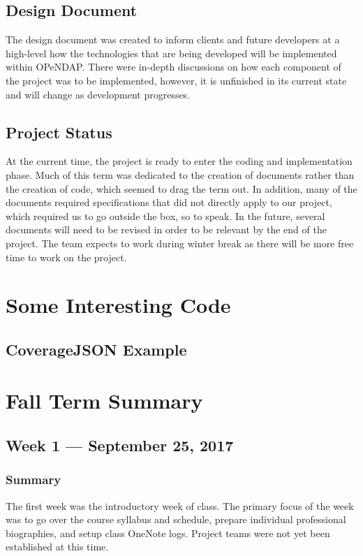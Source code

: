 \documentclass[onecolumn, draftclsnofoot,10pt, compsoc]{IEEEtran}
\begin{document}
\subsection{Design Document}
The design document was created to inform clients and future developers at a high-level how the technologies that are being developed will be implemented within OPeNDAP. There were in-depth discussions on how each component of the project was to be implemented, however, it is unfinished in its current state and will change as development progresses. 

\subsection{Project Status}
At the current time, the project is ready to enter the coding and implementation phase. Much of this term was dedicated to the creation of documents rather than the creation of code, which seemed to drag the term out. In addition, many of the documents required specifications that did not directly apply to our project, which required us to go outside the box, so to speak. In the future, several documents will need to be revised in order to be relevant by the end of the project. The team expects to work  during winter break as there will be more free time to work on the project. 

\section{Some Interesting Code}

\subsection{CoverageJSON Example}
\begin{figure}[H]
    \centering
    
    \label{fig:covjson}
\end{figure}

\section{Fall Term Summary}
\subsection{Week 1 --- September 25, 2017}
\subsubsection{Summary}
The first week was the introductory week of class. The primary focus of the week was to go over the course syllabus and schedule, prepare individual professional biographies, and setup class OneNote logs. Project teams were not yet been established at this time.
\end{document}
